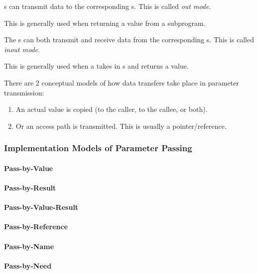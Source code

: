 \begin{definition}\label{def:Parameter_Passing-Out_Mode}
  s can transmit data to the corresponding s.
  This is called \emph{out mode}.

  This is generally used when returning a value from a subprogram.
\end{definition}

\begin{definition}\label{def:Parameter_Passing-Inout_Mode}
  The s can both transmit and receive data from the corresponding s.
  This is called \emph{inout mode}.

  This is generally used when a  takes in s and returns a value.
\end{definition}

There are 2 conceptual models of how data transfers take place in parameter transmission:
\begin{enumerate}[noitemsep]
\item An actual value is copied (to the caller, to the callee, or both).
\item Or an access path is transmitted. This is usually a pointer/reference.
\end{enumerate}

\subsubsection{Implementation Models of Parameter Passing}\label{subsubsec:Implementation_Models_Parameter_Passing}
\paragraph{Pass-by-Value}\label{par:Parameter_Passing-Pass_By_Value}
\paragraph{Pass-by-Result}\label{par:Parameter_Passing-Pass_By_Result}
\paragraph{Pass-by-Value-Result}\label{par:Parameter_Passing-Pass_By_Value_Result}
\paragraph{Pass-by-Reference}\label{par:Parameter_Passing-Pass_By_Reference}
\paragraph{Pass-by-Name}\label{par:Parameter_Passing-Pass_By_Name}
\paragraph{Pass-by-Need}\label{par:Parameter_Passing-Pass_By_Need}

